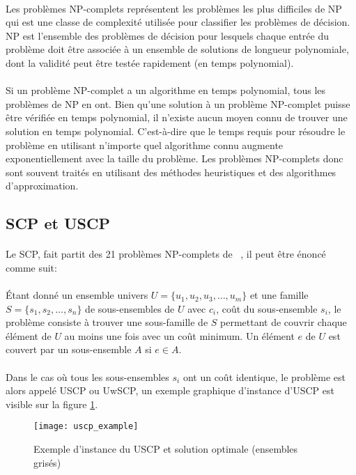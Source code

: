 \documentclass[a4paper,11pt,twoside,french,report]{../common/simplem}
\begin{document}
				\paragraph*{}
					Les problèmes \acrshort{NP}-complets représentent les problèmes les plus difficiles de \acrfull{NP} qui est une classe de complexité utilisée pour classifier les problèmes de décision. \acrshort{NP} est l'ensemble des problèmes de décision pour lesquels chaque entrée du problème doit être associée à un ensemble de solutions de longueur polynomiale, dont la validité peut être testée rapidement (en temps polynomial).
				\paragraph*{}
					Si un problème \acrshort{NP}-complet a un algorithme en temps polynomial, tous les problèmes de \acrshort{NP} en ont. Bien qu'une solution à un problème \acrshort{NP}-complet puisse être vérifiée en temps polynomial, il n'existe aucun moyen connu de trouver une solution en temps polynomial. C'est-à-dire que le temps requis pour résoudre le problème en utilisant n'importe quel algorithme connu augmente exponentiellement avec la taille du problème. Les problèmes \acrshort{NP}-complets donc sont souvent traités en utilisant des méthodes heuristiques et des algorithmes d'approximation.
			\subsection{\acrshort{SCP} et \acrshort{USCP}}
				\paragraph*{}
					Le \gls{SCP}, fait partit des 21 problèmes \acrshort{NP}-complets de \citeauthor{Karp1972}~\cite{Karp1972}, il peut être énoncé comme suit:
				\paragraph*{}
					Étant donné un ensemble univers \(U = \{u_1, u_2, u_3, \dots, u_m\}\) et une famille \(S = \{s_1, s_2, \dots, s_n\}\) de sous-ensembles de \(U\) avec \(c_i\), coût du sous-ensemble \(s_i\), le problème consiste à trouver une sous-famille de \(S\) permettant de couvrir chaque élément de \(U\) au moins une fois avec un coût minimum. Un élément \(e\) de \(U\) est couvert par un sous-ensemble \(A\) si \(e \in A\).
				\paragraph*{}
					Dans le cas où tous les sous-ensembles \(s_i\) ont un coût identique, le problème est alors appelé \gls{USCP} ou \gls{UwSCP}, un exemple graphique d'instance d'\gls{USCP} est visible sur la figure \ref{fig:uscp_example}.
				\begin{figure}[H]
					\centering%
					\texttt{[image: uscp\_example]}%
					\caption{Exemple d'instance du \acrshort{USCP} et solution optimale (ensembles grisés)~\cite{Mount2017}}%
					\label{fig:uscp_example}%
				\end{figure}
\end{document}
